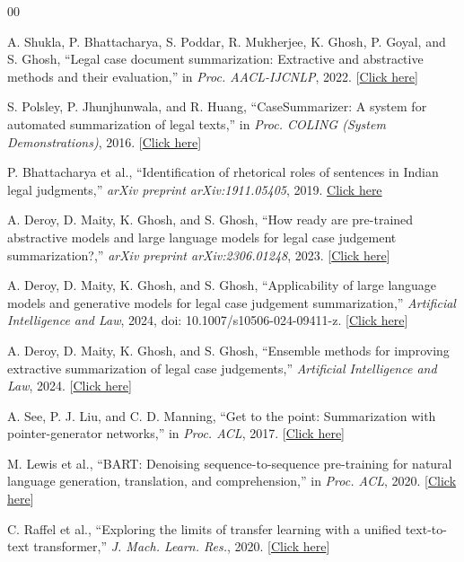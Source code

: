 \documentclass[11pt, a4paper]{article}
\theoremstyle{plain}%
\theoremstyle{remark}%
\theoremstyle{definition}%
\begin{document}
\begin{thebibliography}{00}

A. Shukla, P. Bhattacharya, S. Poddar, R. Mukherjee, K. Ghosh, P. Goyal, and S. Ghosh,
``Legal case document summarization: Extractive and abstractive methods and their evaluation,''
in \emph{Proc. AACL-IJCNLP}, 2022. 
[\href{https://aclanthology.org/2022.aacl-main.77/}{Click here}]

S. Polsley, P. Jhunjhunwala, and R. Huang,
``CaseSummarizer: A system for automated summarization of legal texts,''
in \emph{Proc. COLING (System Demonstrations)}, 2016.
[\href{https://aclanthology.org/C16-2054/}{Click here}]

P. Bhattacharya et al.,
``Identification of rhetorical roles of sentences in Indian legal judgments,''
\emph{arXiv preprint arXiv:1911.05405}, 2019.
\href{https://arxiv.org/abs/1911.05405}{Click here}

A. Deroy, D. Maity, K. Ghosh, and S. Ghosh,
``How ready are pre-trained abstractive models and large language models for legal case judgement summarization?,'' 
\emph{arXiv preprint arXiv:2306.01248}, 2023.
[\href{https://arxiv.org/abs/2306.01248}{Click here}]

A. Deroy, D. Maity, K. Ghosh, and S. Ghosh,
``Applicability of large language models and generative models for legal case judgement summarization,''
\emph{Artificial Intelligence and Law}, 2024,
doi: 10.1007/s10506-024-09411-z.
[\href{https://doi.org/10.1007/s10506-024-09411-z}{Click here}]

A. Deroy, D. Maity, K. Ghosh, and S. Ghosh,
``Ensemble methods for improving extractive summarization of legal case judgements,''
\emph{Artificial Intelligence and Law}, 2024.
[\href{https://doi.org/10.1007/s10506-023-09349-8}{Click here}]

A. See, P. J. Liu, and C. D. Manning,
``Get to the point: Summarization with pointer-generator networks,''
in \emph{Proc. ACL}, 2017.
[\href{https://arxiv.org/abs/1704.04368}{Click here}]

M. Lewis et al.,
``BART: Denoising sequence-to-sequence pre-training for natural language generation, translation, and comprehension,''
in \emph{Proc. ACL}, 2020.
[\href{https://aclanthology.org/2020.acl-main.703/}{Click here}]

C. Raffel et al.,
``Exploring the limits of transfer learning with a unified text-to-text transformer,''
\emph{J. Mach. Learn. Res.}, 2020.
[\href{https://jmlr.org/papers/v21/20-074.html}{Click here}]


\end{thebibliography}
\end{document}
